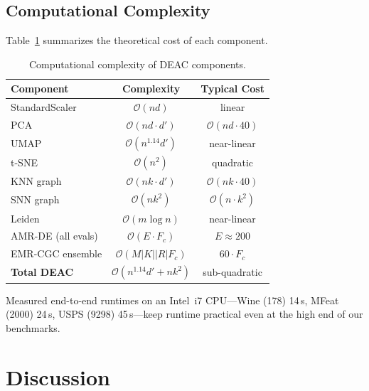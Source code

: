 \documentclass[conference]{IEEEtran}
\begin{document}
\subsection{Computational Complexity}

Table~\ref{tab:complexity} summarizes the theoretical cost of each component.

\begin{table}[htbp]
\centering
\caption{Computational complexity of DEAC components.}
\label{tab:complexity}
\footnotesize
\setlength{\tabcolsep}{3pt}
\begin{tabular}{lcc}
\toprule
Component & Complexity & Typical Cost \\
\midrule
StandardScaler        & $\mathcal{O}(nd)$                   & linear \\
PCA                   & $\mathcal{O}(nd \cdot d')$          & $\mathcal{O}(nd \cdot 40)$ \\
UMAP                  & $\mathcal{O}(n^{1.14} d')$          & near-linear \\
t-SNE                 & $\mathcal{O}(n^2)$                  & quadratic \\
KNN graph             & $\mathcal{O}(nk \cdot d')$          & $\mathcal{O}(nk \cdot 40)$ \\
SNN graph             & $\mathcal{O}(nk^2)$                 & $\mathcal{O}(n \cdot k^2)$ \\
Leiden                & $\mathcal{O}(m \log n)$             & near-linear \\
AMR-DE (all evals)    & $\mathcal{O}(E \cdot F_c)$          & $E{\approx}200$ \\
EMR-CGC ensemble      & $\mathcal{O}(M|K||R| F_c)$          & $60 \cdot F_c$ \\
\midrule
\textbf{Total DEAC}   & $\mathcal{O}(n^{1.14} d' + n k^2)$  & sub-quadratic \\
\bottomrule
\end{tabular}
\end{table}

Measured end-to-end runtimes on an Intel~i7 CPU---Wine (178) 14\,s, MFeat (2000) 24\,s, USPS (9298) 45\,s---keep runtime practical even at the high end of our benchmarks.

\section{Discussion}\label{sec:disc}
\end{document}
